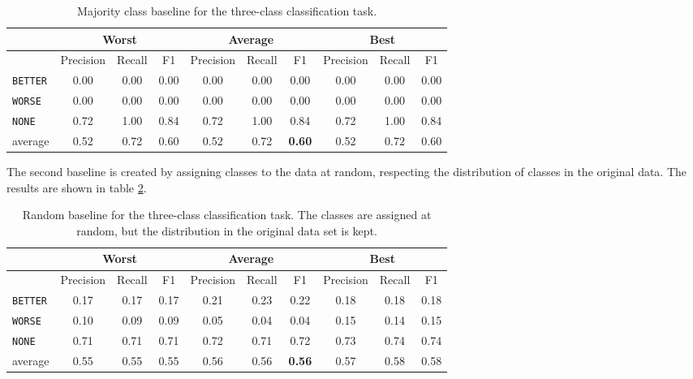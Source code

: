     \begin{table}[h]
\centering
\caption{Majority class baseline for the three-class classification task.}
\label{tbl:majority_class_baseline}
\begin{tabular}{@{}lccccccccc@{}}
\toprule
      & \multicolumn{3}{c}{Worst} & \multicolumn{3}{c}{Average} & \multicolumn{3}{c}{Best}  \\ \midrule
                 & Precision  & Recall & F1   & Precision  & Recall  & F1    & Precision & Recall & F1   \\ \toprule

    
\texttt{BETTER}	 & 0.00	 & 0.00	 & 0.00	 &0.00	 & 0.00	 & 0.00	 &0.00	 & 0.00	 & 0.00	 \\ 
\texttt{WORSE}	 & 0.00	 & 0.00	 & 0.00	 &0.00	 & 0.00	 & 0.00	 &0.00	 & 0.00	 & 0.00	 \\ 
\texttt{NONE}	 & 0.72	 & 1.00	 & 0.84	 &0.72	 & 1.00	 & 0.84	 &0.72	 & 1.00	 & 0.84	 \\ \midrule 
average	 & 0.52	 & 0.72	 & 0.60	 &0.52	 & 0.72	 & \textbf{0.60}	 &0.52	 & 0.72	 & 0.60	 \\ \bottomrule

    \end{tabular}
\end{table}

The second baseline is created by assigning classes to the data at random, respecting the distribution of classes in the original data. The results are shown in table \ref{tbl:random_baseline}.

 \begin{table}[h]
                \centering
\caption{Random baseline for the three-class classification task. The classes are assigned at random, but the distribution in the original data set is kept.}
\label{tbl:random_baseline}
 \begin{tabular}{@{}lccccccccc@{}}
              \toprule
               & \multicolumn{3}{c}{Worst} & \multicolumn{3}{c}{Average} & \multicolumn{3}{c}{Best}  \\ \midrule
               & Precision  & Recall & F1   & Precision  & Recall  & F1    & Precision & Recall & F1   \\ \toprule
\texttt{BETTER}	 & 0.17	 & 0.17	 & 0.17	 &0.21	 & 0.23	 & 0.22	 &0.18	 & 0.18	 & 0.18	 \\ 
\texttt{WORSE}	 & 0.10	 & 0.09	 & 0.09	 &0.05	 & 0.04	 & 0.04	 &0.15	 & 0.14	 & 0.15	 \\ 
\texttt{NONE}	 & 0.71	 & 0.71	 & 0.71	 &0.72	 & 0.71	 & 0.72	 &0.73	 & 0.74	 & 0.74	 \\ \midrule 
average	 & 0.55	 & 0.55	 & 0.55	 &0.56	 & 0.56	 & \textbf{0.56}	 &0.57	 & 0.58	 & 0.58	 \\ \bottomrule

    \end{tabular}
\end{table}


